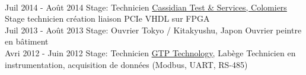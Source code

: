 \documentclass[letterpaper]{twentysecondcv} %
\begin{document}
\begin{twenty}
{  }
  \\
  \twentyitem
  {Juil 2014 -}
  {Août 2014}
  {Stage: Technicien}
  {\href{http://www.spherea.com/fr}{Cassidian Test \& Services, Colomiers}}
  {}
  {
    Stage technicien création liaison PCIe VHDL sur FPGA
  }
  \\
  \twentyitem
  {Juil 2013 -}
  {Août 2013}
  {Stage: Ouvrier}
  {Tokyo / Kitakyushu, Japon}
  {}
  {
    Ouvrier peintre en bâtiment
  }
  \\
  \twentyitem
  {Avri 2012 -}
  {Juin 2012}
  {Stage: Technicien}
  {\href{https://www.gtptech.com/}{GTP Technology}, Labège}
  {}
  {
    Technicien en instrumentation, acquisition de données (Modbus, UART, RS-485)
  }  
\end{twenty}
\end{document}
